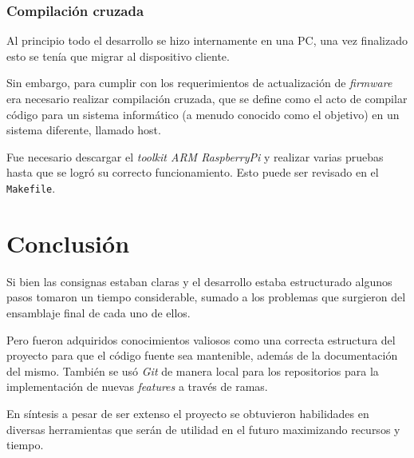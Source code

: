\documentclass[14.5pt,a4paper]{article}
\begin{document}
\subsubsection{Compilación cruzada}
Al principio todo el desarrollo se hizo internamente en una PC, una vez finalizado esto se tenía que migrar al dispositivo cliente.

Sin embargo, para cumplir con los requerimientos de actualización de \textit{firmware} era necesario realizar compilación cruzada, que se define como el acto de compilar código para un sistema informático (a menudo conocido como el objetivo) en un sistema diferente, llamado host.

Fue necesario descargar el \textit{toolkit ARM RaspberryPi} y realizar varias pruebas hasta que se logró su correcto funcionamiento. Esto puede ser revisado en el \texttt{Makefile}.

\section{Conclusión}
Si bien las consignas estaban claras y el desarrollo estaba estructurado algunos pasos tomaron un tiempo considerable, sumado a los problemas que surgieron del ensamblaje final de cada uno de ellos. 

Pero fueron adquiridos conocimientos valiosos como una correcta estructura del proyecto para que el código fuente sea mantenible, además de la documentación del mismo. También se usó \textit{Git} de manera local para los repositorios para la implementación de nuevas \textit{features} a través de ramas.

En síntesis a pesar de ser extenso el proyecto se obtuvieron habilidades en diversas herramientas que serán de utilidad en el futuro maximizando recursos y tiempo.

\clearpage
%
\end{document}
